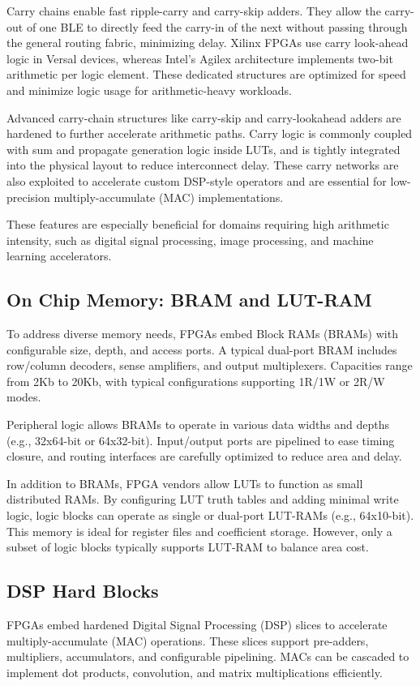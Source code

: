 Carry chains enable fast ripple-carry and carry-skip adders. They allow the carry-out of one BLE to directly feed the carry-in of the next without passing through the general routing fabric, minimizing delay. Xilinx FPGAs use carry look-ahead logic in Versal devices, whereas Intel’s Agilex architecture implements two-bit arithmetic per logic element. These dedicated structures are optimized for speed and minimize logic usage for arithmetic-heavy workloads.

Advanced carry-chain structures like carry-skip and carry-lookahead adders are hardened to further accelerate arithmetic paths. Carry logic is commonly coupled with sum and propagate generation logic inside LUTs, and is tightly integrated into the physical layout to reduce interconnect delay. These carry networks are also exploited to accelerate custom DSP-style operators and are essential for low-precision multiply-accumulate (MAC) implementations.

These features are especially beneficial for domains requiring high arithmetic intensity, such as digital signal processing, image processing, and machine learning accelerators.

\subsection{On Chip Memory: BRAM and LUT-RAM}
To address diverse memory needs, FPGAs embed Block RAMs (BRAMs) with configurable size, depth, and access ports\cite{funda-fpga-arch-8}\cite{funda-fpga-arch-9}. A typical dual-port BRAM includes row/column decoders, sense amplifiers, and output multiplexers. Capacities range from 2Kb to 20Kb, with typical configurations supporting 1R/1W or 2R/W modes.

Peripheral logic allows BRAMs to operate in various data widths and depths (e.g., 32x64-bit or 64x32-bit)\cite{funda-fpga-arch-10}\cite{funda-fpga-arch-11}. Input/output ports are pipelined to ease timing closure, and routing interfaces are carefully optimized to reduce area and delay.

In addition to BRAMs, FPGA vendors allow LUTs to function as small distributed RAMs. By configuring LUT truth tables and adding minimal write logic, logic blocks can operate as single or dual-port LUT-RAMs (e.g., 64x10-bit). This memory is ideal for register files and coefficient storage. However, only a subset of logic blocks typically supports LUT-RAM to balance area cost\cite{funda-fpga-arch-12}.

\subsection{DSP Hard Blocks}
FPGAs embed hardened Digital Signal Processing (DSP) slices to accelerate multiply-accumulate (MAC) operations. These slices support pre-adders, multipliers, accumulators, and configurable pipelining\cite{funda-fpga-arch-13}. MACs can be cascaded to implement dot products, convolution, and matrix multiplications efficiently.

